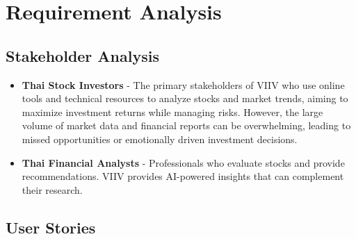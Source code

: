 \chapter{Requirement Analysis}
\label{chap:requirement-analysis}

\section{Stakeholder Analysis}
\label{section:stakeholder-analysis}

\begin{itemize}
    \item\textbf{Thai Stock Investors} - The primary stakeholders of VIIV who use online tools and technical resources to analyze stocks and market trends, aiming to maximize investment returns while managing risks. However, the large volume of market data and financial reports can be overwhelming, leading to missed opportunities or emotionally driven investment decisions. 
    \item \textbf{Thai Financial Analysts} - Professionals who evaluate stocks and provide recommendations. VIIV provides AI-powered insights that can complement their research.
\end{itemize}

\section{User Stories}
\label{section:user-stories}

